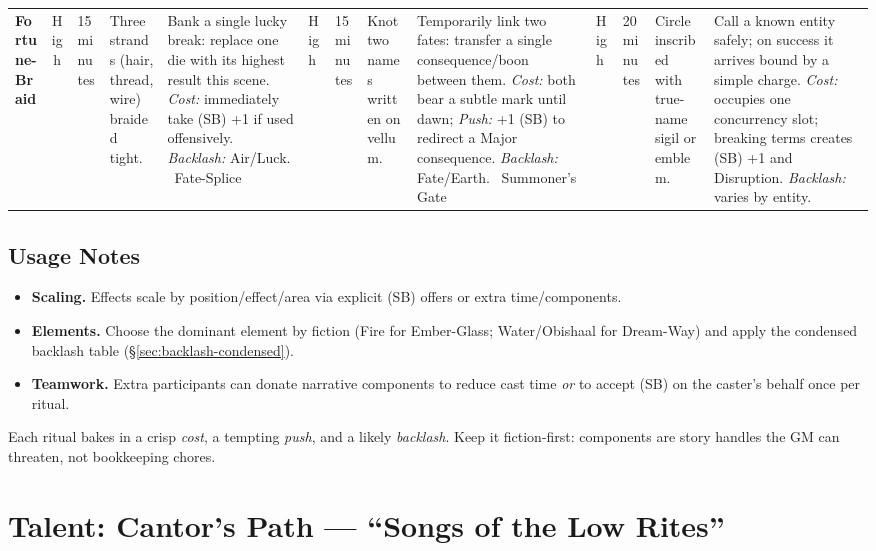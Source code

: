 \begin{table}[h]
\begin{tabularx}{\linewidth}{>{\bfseries}l c l X X}
Fortune-Braid & High & 15 minutes & Three strands (hair, thread, wire) braided tight. & Bank a single lucky break: replace one die with its highest result this scene. \emph{Cost:} immediately take (SB) +1 if used offensively. \emph{Backlash:} Air/Luck. \
Fate-Splice & High & 15 minutes & Knot two names written on vellum. & Temporarily link two fates: transfer a single consequence/boon between them. \emph{Cost:} both bear a subtle mark until dawn; \emph{Push:} +1 (SB) to redirect a Major consequence. \emph{Backlash:} Fate/Earth. \
Summoner’s Gate & High & 20 minutes & Circle inscribed with true-name sigil or emblem. & Call a known entity safely; on success it arrives bound by a simple charge. \emph{Cost:} occupies one concurrency slot; breaking terms creates (SB) +1 and Disruption. \emph{Backlash:} varies by entity. \
\bottomrule
\end{tabularx}
\end{table}

\subsection*{Usage Notes}\label{subsec:ritual-usage}
\begin{itemize}
\item \textbf{Scaling.} Effects scale by position/effect/area via explicit (SB) offers or extra time/components.
\item \textbf{Elements.} Choose the dominant element by fiction (Fire for Ember-Glass; Water/Obishaal for Dream-Way) and apply the condensed backlash table (\S\ref{sec:backlash-condensed}).
\item \textbf{Teamwork.} Extra participants can donate narrative components to reduce cast time \emph{or} to accept (SB) on the caster’s behalf once per ritual.
\end{itemize}

\begin{tcolorbox}[title={Design Intent},colback=gray!5,colframe=black]
Each ritual bakes in a crisp \emph{cost}, a tempting \emph{push}, and a likely \emph{backlash}. Keep it fiction-first: components are story handles the GM can threaten, not bookkeeping chores.\end{tcolorbox}

\section{Talent: Cantor's Path --- ``Songs of the Low Rites''}
\label{talent:cantors-path}

